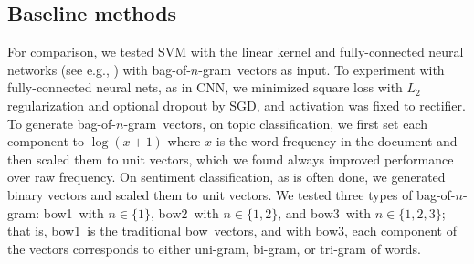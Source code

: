 \documentclass[11pt,letterpaper]{article}
\newcommand{\cnn}{CNN}
\newcommand{\bow}{{bow}}
\newcommand{\bowone}{{bow1}}
\newcommand{\bowtwo}{{bow2}}
\newcommand{\bowthree}{{bow3}}
\newcommand{\bongram}{bag-of-$n$-gram}
\begin{document}
\subsection{Baseline methods} 
For comparison, we tested SVM
with the linear kernel and 
fully-connected neural networks
(see e.g., )
with \bongram\ vectors as input.  
To experiment with fully-connected neural nets, 
as in \cnn, we minimized square loss 
with $L_2$ regularization 
and optional dropout
by SGD, and activation was fixed 
to rectifier.  
To generate \bongram\ vectors, 
on topic classification, 
we first set each component to $\log(x+1)$ 
where $x$ is the word frequency in the document and then scaled them to unit vectors, 
which we found always %
improved performance over raw frequency.  
On sentiment classification, as is often done, we generated binary vectors and scaled them 
to unit vectors. 
%
We tested three types of \bongram: 
\bowone\ with $n \in \{1\}$, \bowtwo\ with $n \in \{1,2\}$, and \bowthree\ with $n \in \{1,2,3\}$; 
that is, \bowone\ is the traditional \bow\ vectors, and 
with \bowthree, each component of the vectors corresponds to either uni-gram, bi-gram, 
or tri-gram of words.  

\end{document}
